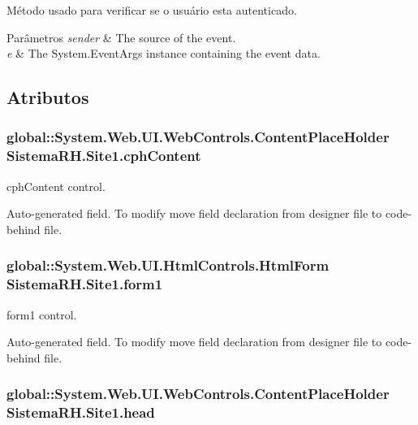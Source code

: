 Método usado para verificar se o usuário esta autenticado. 


\begin{DoxyParams}{Parâmetros}
{\em sender} & The source of the event.\\
\hline
{\em e} & The System.EventArgs instance containing the event data.\\
\hline
\end{DoxyParams}


\subsection{Atributos}
\hypertarget{class_sistema_r_h_1_1_site1_a80adb0365da81c910b285f21a5ac1d36}{
\subsubsection[{cphContent}]{\setlength{\rightskip}{0pt plus 5cm}global::System.Web.UI.WebControls.ContentPlaceHolder {\bf SistemaRH.Site1.cphContent}}}
\label{class_sistema_r_h_1_1_site1_a80adb0365da81c910b285f21a5ac1d36}


cphContent control. 

Auto-\/generated field. To modify move field declaration from designer file to code-\/behind file. \hypertarget{class_sistema_r_h_1_1_site1_ab54b21b54025b52cd7d20a2f88de7d6e}{
\subsubsection[{form1}]{\setlength{\rightskip}{0pt plus 5cm}global::System.Web.UI.HtmlControls.HtmlForm {\bf SistemaRH.Site1.form1}}}
\label{class_sistema_r_h_1_1_site1_ab54b21b54025b52cd7d20a2f88de7d6e}


form1 control. 

Auto-\/generated field. To modify move field declaration from designer file to code-\/behind file. \hypertarget{class_sistema_r_h_1_1_site1_a787750eff16f448a0cb55e3eb6a0c9af}{
\subsubsection[{head}]{\setlength{\rightskip}{0pt plus 5cm}global::System.Web.UI.WebControls.ContentPlaceHolder {\bf SistemaRH.Site1.head}}}
\label{class_sistema_r_h_1_1_site1_a787750eff16f448a0cb55e3eb6a0c9af}



